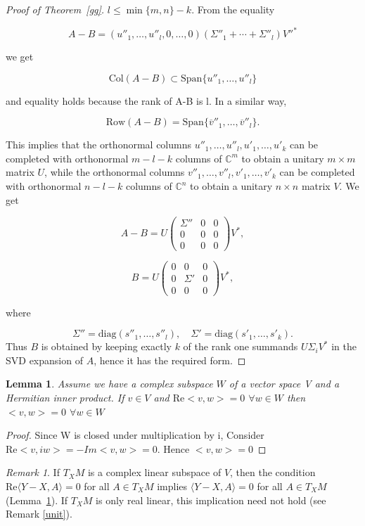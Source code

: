 \documentclass[11pt]{amsart}
\theoremstyle{plain}
\newtheorem{lemma}[theorem]{Lemma}
\theoremstyle{definition}
\theoremstyle{remark}
\newtheorem{remark}[theorem]{Remark}
\begin{document}
\begin{proof}[Proof of Theorem~\ref{gg}]
$
l \leq \min\{m, n\} - k.
$
From the equality 

\[
A - B = (u''_1, \dots, u''_l, 0, \dots, 0)(\Sigma''_1 + \cdots + \Sigma''_l)V''^*
\]

we get 

\[
\text{Col}(A - B) \subset \text{Span}\{u''_1, \dots, u''_l\}
\]

and equality holds because the rank of A-B is l. In a similar way, 

\[
\text{Row}(A - B) = \text{Span}\{\overline{v}''_1, \dots, \overline{v}''_l\}.
\]

This implies that the orthonormal columns \( u''_1, \dots, u''_l, u'_1, \dots, u'_k \) can be completed with orthonormal \( m - l - k \) columns of \( \mathbb{C}^m \) to obtain a unitary \( m \times m \) matrix \( U \), while the orthonormal columns \( v''_1, \dots, v''_l, v'_1, \dots, v'_k \) can be completed with orthonormal \( n - l - k \) columns of \( \mathbb{C}^n \) to obtain a unitary \( n \times n \) matrix \( V \). We get 

\[
A - B = U
\begin{pmatrix}
\Sigma'' & 0 & 0 \\
0 & 0 & 0 \\
0 & 0 & 0
\end{pmatrix}
V^*,
\]

\[
B = U
\begin{pmatrix}
0 & 0 & 0 \\
0 & \Sigma' & 0 \\
0 & 0 & 0
\end{pmatrix}
V^*,
\]

where 

\[
\Sigma'' = \mathrm{diag}(s''_1, \dots, s''_l), \quad \Sigma' = \mathrm{diag}(s'_1, \dots, s'_k).
\]
 Thus $B$ is obtained by keeping exactly $k$ of the rank one summands $U\Sigma_iV^*$ in the SVD expansion of $A$, hence it has the required form.



\end{proof}
\begin{lemma}\label{Complex}
   Assume we have a complex subspace $W$ of a vector space V and a Hermitian inner product. If $v \in V$ and $\mathrm{Re} <v,w>=0$ $\forall w \in W$ then $<v,w>=0$   $\forall w \in W$
\end{lemma}
\begin{proof}
    Since W is closed under multiplication by i, Consider $\mathrm{Re} <v,iw>=-Im<v,w>=0$. Hence $<v,w>=0$
\end{proof}
\begin{remark}
If $T_XM$ is a complex linear subspace of $V$, then the condition
$\mathrm{Re}\langle Y-X, A\rangle = 0$ for all $A\in T_XM$ implies
$\langle Y-X, A\rangle = 0$ for all $A\in T_XM$ (Lemma~\ref{Complex}).
If $T_XM$ is only real linear, this implication need not hold (see Remark \ref{unit}).
\end{remark}
\end{document}
